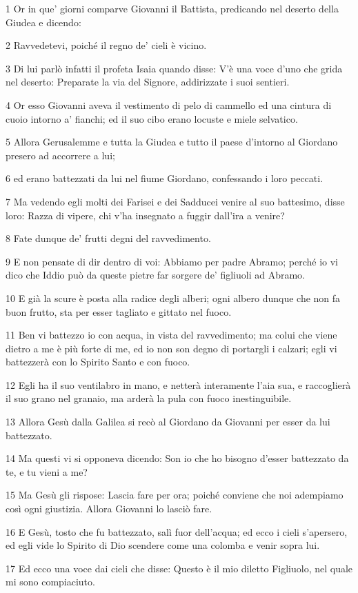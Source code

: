 \par 1 Or in que' giorni comparve Giovanni il Battista, predicando nel deserto della Giudea e dicendo:
\par 2 Ravvedetevi, poiché il regno de' cieli è vicino.
\par 3 Di lui parlò infatti il profeta Isaia quando disse: V'è una voce d'uno che grida nel deserto: Preparate la via del Signore, addirizzate i suoi sentieri.
\par 4 Or esso Giovanni aveva il vestimento di pelo di cammello ed una cintura di cuoio intorno a' fianchi; ed il suo cibo erano locuste e miele selvatico.
\par 5 Allora Gerusalemme e tutta la Giudea e tutto il paese d'intorno al Giordano presero ad accorrere a lui;
\par 6 ed erano battezzati da lui nel fiume Giordano, confessando i loro peccati.
\par 7 Ma vedendo egli molti dei Farisei e dei Sadducei venire al suo battesimo, disse loro: Razza di vipere, chi v'ha insegnato a fuggir dall'ira a venire?
\par 8 Fate dunque de' frutti degni del ravvedimento.
\par 9 E non pensate di dir dentro di voi: Abbiamo per padre Abramo; perché io vi dico che Iddio può da queste pietre far sorgere de' figliuoli ad Abramo.
\par 10 E già la scure è posta alla radice degli alberi; ogni albero dunque che non fa buon frutto, sta per esser tagliato e gittato nel fuoco.
\par 11 Ben vi battezzo io con acqua, in vista del ravvedimento; ma colui che viene dietro a me è più forte di me, ed io non son degno di portargli i calzari; egli vi battezzerà con lo Spirito Santo e con fuoco.
\par 12 Egli ha il suo ventilabro in mano, e netterà interamente l'aia sua, e raccoglierà il suo grano nel granaio, ma arderà la pula con fuoco inestinguibile.
\par 13 Allora Gesù dalla Galilea si recò al Giordano da Giovanni per esser da lui battezzato.
\par 14 Ma questi vi si opponeva dicendo: Son io che ho bisogno d'esser battezzato da te, e tu vieni a me?
\par 15 Ma Gesù gli rispose: Lascia fare per ora; poiché conviene che noi adempiamo così ogni giustizia. Allora Giovanni lo lasciò fare.
\par 16 E Gesù, tosto che fu battezzato, salì fuor dell'acqua; ed ecco i cieli s'apersero, ed egli vide lo Spirito di Dio scendere come una colomba e venir sopra lui.
\par 17 Ed ecco una voce dai cieli che disse: Questo è il mio diletto Figliuolo, nel quale mi sono compiaciuto.

